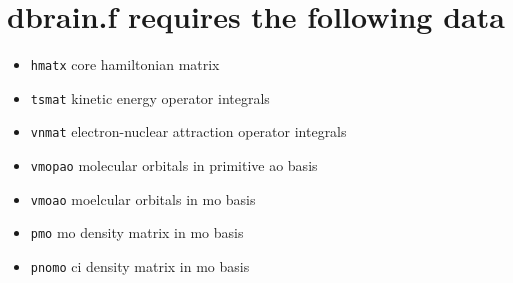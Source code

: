 \documentclass[10pt]{article}
\begin{document}
\section{dbrain.f requires the following data}
    \begin{itemize}
        \item \verb!hmatx! core hamiltonian matrix 
        \item \verb!tsmat! kinetic energy operator integrals
        \item \verb!vnmat! electron-nuclear attraction operator integrals
        \item \verb!vmopao! molecular orbitals in primitive ao basis
        \item \verb!vmoao! moelcular orbitals in mo basis
        \item \verb!pmo! mo density matrix in mo basis
        \item \verb!pnomo! ci density matrix in mo basis  
    \end{itemize}
\end{document}
